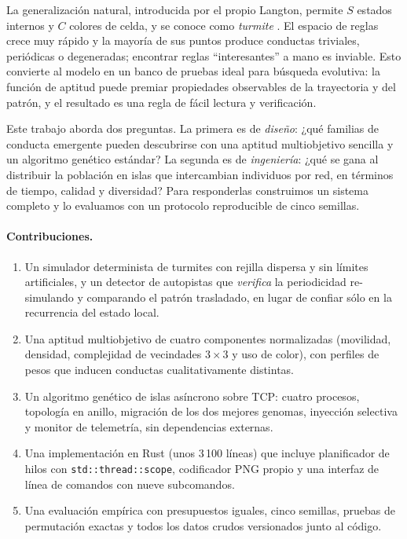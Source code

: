 \documentclass[11pt,a4paper]{article}
\begin{document}
La generalizaci\'on natural, introducida por el propio Langton, permite $S$
estados internos y $C$ colores de celda, y se conoce como \emph{turmite}
\citep{langton1986,gale1995}.  El espacio de reglas crece muy r\'apido y la
mayor\'ia de sus puntos produce conductas triviales, peri\'odicas o
degeneradas; encontrar reglas ``interesantes'' a mano es inviable.  Esto
convierte al modelo en un banco de pruebas ideal para b\'usqueda evolutiva:
la funci\'on de aptitud puede premiar propiedades observables de la
trayectoria y del patr\'on, y el resultado es una regla de f\'acil lectura y
verificaci\'on.

Este trabajo aborda dos preguntas.  La primera es de \emph{dise\~no}: ¿qu\'e
familias de conducta emergente pueden descubrirse con una aptitud multiobjetivo
sencilla y un algoritmo gen\'etico est\'andar?  La segunda es de
\emph{ingenier\'ia}: ¿qu\'e se gana al distribuir la poblaci\'on en islas
que intercambian individuos por red, en t\'erminos de tiempo, calidad y
diversidad?  Para responderlas construimos un sistema completo y lo evaluamos
con un protocolo reproducible de cinco semillas.

\paragraph{Contribuciones.}
\begin{enumerate}
  \item Un simulador determinista de turmites con rejilla dispersa y sin l\'imites
        artificiales, y un detector de autopistas que \emph{verifica} la
        periodicidad re-simulando y comparando el patr\'on trasladado, en lugar
        de confiar s\'olo en la recurrencia del estado local.
  \item Una aptitud multiobjetivo de cuatro componentes normalizadas
        (movilidad, densidad, complejidad de vecindades $3\times3$ y uso de
        color), con perfiles de pesos que inducen conductas cualitativamente
        distintas.
  \item Un algoritmo gen\'etico de islas as\'incrono sobre TCP: cuatro procesos,
        topolog\'ia en anillo, migraci\'on de los dos mejores genomas,
        inyecci\'on selectiva y monitor de telemetr\'ia, sin dependencias
        externas.
  \item Una implementaci\'on en Rust (unos 3\,100 l\'ineas) que incluye
        planificador de hilos con \texttt{std::thread::scope}, codificador PNG
        propio y una interfaz de l\'inea de comandos con nueve subcomandos.
  \item Una evaluaci\'on emp\'irica con presupuestos iguales, cinco semillas,
        pruebas de permutaci\'on exactas y todos los datos crudos versionados
        junto al c\'odigo.
\end{enumerate}
\end{document}
